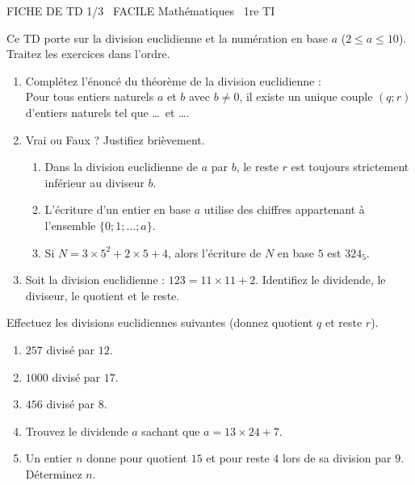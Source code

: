 \documentclass[11pt]{article}
\begin{document}
\begin{tcolorbox}[enhanced,colback=popink,colframe=popink,arc=10pt,boxrule=0pt,left=12pt,right=12pt,top=9pt,bottom=9pt]
{\color{white}\popxbold\small FICHE DE TD 1/3 \textbullet\ FACILE \hfill Mathématiques \textbullet\ 1re TI\par}
\end{tcolorbox}
\vspace{4pt}
Ce TD porte sur la division euclidienne et la numération en base $a$ ($2 \le a \le 10$). Traitez les exercices dans l'ordre.

\begin{exercice}
\begin{enumerate}
    \item Complétez l'énoncé du théorème de la division euclidienne :\\
    Pour tous entiers naturels $a$ et $b$ avec $b \neq 0$, il existe un unique couple $(q; r)$ d'entiers naturels tel que \ldots\ et \ldots.
    \item Vrai ou Faux ? Justifiez brièvement.
    \begin{enumerate}
        \item Dans la division euclidienne de $a$ par $b$, le reste $r$ est toujours strictement inférieur au diviseur $b$.
        \item L'écriture d'un entier en base $a$ utilise des chiffres appartenant à l'ensemble $\{0; 1; \dots; a\}$.
        \item Si $N = 3 \times 5^2 + 2 \times 5 + 4$, alors l'écriture de $N$ en base $5$ est $324_5$.
    \end{enumerate}
    \item Soit la division euclidienne : $123 = 11 \times 11 + 2$. Identifiez le dividende, le diviseur, le quotient et le reste.
\end{enumerate}
\end{exercice}

\begin{exercice}
Effectuez les divisions euclidiennes suivantes (donnez quotient $q$ et reste $r$).
\begin{enumerate}
    \item $257$ divisé par $12$.
    \item $1000$ divisé par $17$.
    \item $456$ divisé par $8$.
    \item Trouvez le dividende $a$ sachant que $a = 13 \times 24 + 7$.
    \item Un entier $n$ donne pour quotient $15$ et pour reste $4$ lors de sa division par $9$. Déterminez $n$.
\end{enumerate}
\end{exercice}
\end{document}
